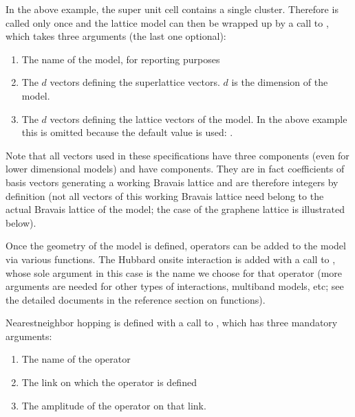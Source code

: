 \documentclass[letterpaper,10pt,english]{sphinxmanual}
\begin{document}
\sphinxAtStartPar
In the above example, the super unit cell contains a single cluster. Therefore  is called only once and the lattice model can then be wrapped up by a call to , which takes three arguments (the last one optional):
\begin{enumerate}
%
\item {} 
\sphinxAtStartPar
The name of the model, for reporting purposes

\item {} 
\sphinxAtStartPar
The \(d\) vectors defining the superlattice vectors. \(d\) is the dimension of the model.

\item {} 
\sphinxAtStartPar
The \(d\) vectors defining the lattice vectors of the model. In the above example this is omitted because the default value is used: \sphinxcode{\sphinxupquote{{[}{[}1,0,0{]}, {[}0,1,0{]}{]}}}.

\end{enumerate}

\sphinxAtStartPar
Note that all vectors used in these specifications have three components (even for lower dimensional models) and have  components. They are in fact coefficients of basis vectors generating a working Bravais lattice and are therefore integers by definition (not all vectors of this working Bravais lattice need belong to the actual Bravais lattice of the model; the case of the graphene lattice is illustrated below).

\sphinxAtStartPar
Once the geometry of the model is defined, operators can be added to the model via various functions. The Hubbard on\sphinxhyphen{}site interaction is added with a call to , whose sole argument in this case is the name we choose for that operator (more arguments are needed for other types of interactions, multi\sphinxhyphen{}band models, etc; see the detailed documents in the reference section on functions).

\sphinxAtStartPar
Nearest\sphinxhyphen{}neighbor hopping is defined with a call to , which has three mandatory arguments:
\begin{enumerate}
%
\item {} 
\sphinxAtStartPar
The name of the operator

\item {} 
\sphinxAtStartPar
The link on which the operator is defined

\item {} 
\sphinxAtStartPar
The amplitude of the operator on that link.

\end{enumerate}
\end{document}
